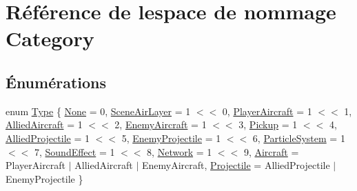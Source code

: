 \hypertarget{namespace_category}{}\section{Référence de l\textquotesingle{}espace de nommage Category}
\label{namespace_category}
\subsection*{Énumérations}
\begin{DoxyCompactItemize}
\item 
enum \hyperlink{namespace_category_a2ff936dbd42aeae91fdfb6f8456a8ab0}{Type} \{ \newline
\hyperlink{namespace_category_a2ff936dbd42aeae91fdfb6f8456a8ab0af5e99963224a9d7e0d16e4a782446ebf}{None} = 0, 
\hyperlink{namespace_category_a2ff936dbd42aeae91fdfb6f8456a8ab0a59ec17bed2faaeedb924e43c6688fdb6}{Scene\+Air\+Layer} = 1 $<$$<$ 0, 
\hyperlink{namespace_category_a2ff936dbd42aeae91fdfb6f8456a8ab0ac17fded322e70d4086e2f5dfcc706679}{Player\+Aircraft} = 1 $<$$<$ 1, 
\hyperlink{namespace_category_a2ff936dbd42aeae91fdfb6f8456a8ab0a05584389175665f09038745d7486f798}{Allied\+Aircraft} = 1 $<$$<$ 2, 
\newline
\hyperlink{namespace_category_a2ff936dbd42aeae91fdfb6f8456a8ab0a200d37e43bb2556f6e93fcc933124034}{Enemy\+Aircraft} = 1 $<$$<$ 3, 
\hyperlink{namespace_category_a2ff936dbd42aeae91fdfb6f8456a8ab0a50696d5f814f48670fcc15992d4d2e63}{Pickup} = 1 $<$$<$ 4, 
\hyperlink{namespace_category_a2ff936dbd42aeae91fdfb6f8456a8ab0ab6dae450e1592e77d234a9aed8ae88f7}{Allied\+Projectile} = 1 $<$$<$ 5, 
\hyperlink{namespace_category_a2ff936dbd42aeae91fdfb6f8456a8ab0a056d392fd1f73f5070d11ffdf35e4426}{Enemy\+Projectile} = 1 $<$$<$ 6, 
\newline
\hyperlink{namespace_category_a2ff936dbd42aeae91fdfb6f8456a8ab0a2ed77ca55287fe83bae350fcea6827fc}{Particle\+System} = 1 $<$$<$ 7, 
\hyperlink{namespace_category_a2ff936dbd42aeae91fdfb6f8456a8ab0acafa91f74099a7d83020f09247107089}{Sound\+Effect} = 1 $<$$<$ 8, 
\hyperlink{namespace_category_a2ff936dbd42aeae91fdfb6f8456a8ab0abd82f2d95425d6dc2091677ba6f5bbe1}{Network} = 1 $<$$<$ 9, 
\hyperlink{namespace_category_a2ff936dbd42aeae91fdfb6f8456a8ab0a6d13552a39dddfaae551274f79990c53}{Aircraft} = Player\+Aircraft $\vert$ Allied\+Aircraft $\vert$ Enemy\+Aircraft, 
\newline
\hyperlink{namespace_category_a2ff936dbd42aeae91fdfb6f8456a8ab0a4f97cb6c85f0c5d57b215b66ba74b84e}{Projectile} = Allied\+Projectile $\vert$ Enemy\+Projectile
 \}
\end{DoxyCompactItemize}


